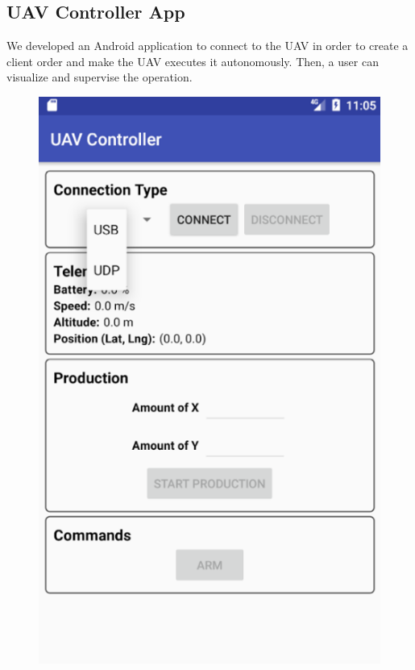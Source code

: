 \documentclass[12pt]{article}
\begin{document}
\subsection{UAV Controller App}
\label{subsec:app}

We developed an Android application to connect to the UAV in order to create a client order and make the UAV executes it autonomously. Then, a user can visualize and supervise the operation.

\begin{figure}[]
\centering
\begin{minipage}{.55\textwidth}
  \centering
  \includegraphics[width=.7\linewidth]{appMain}
  \label{fig:appMain}
\end{minipage}%
\begin{minipage}{.55\textwidth}
  \centering

\end{minipage}
\end{figure}
\end{document}
